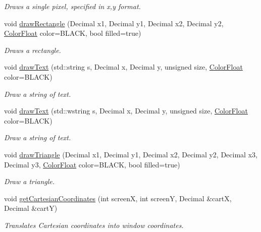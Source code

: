 \begin{DoxyCompactItemize}
\begin{DoxyCompactList}\small\item\em Draws a single pixel, specified in x,y format. \end{DoxyCompactList}\item 
void \hyperlink{classtsgl_1_1_cartesian_canvas_a5e88e7d751e24ae78d158f1d8e9faf5e}{draw\+Rectangle} (Decimal x1, Decimal y1, Decimal x2, Decimal y2, \hyperlink{structtsgl_1_1_color_float}{Color\+Float} color=B\+L\+A\+C\+K, bool filled=true)
\begin{DoxyCompactList}\small\item\em Draws a rectangle. \end{DoxyCompactList}\item 
void \hyperlink{classtsgl_1_1_cartesian_canvas_abb27abec67e31c0542e65bac08e977e6}{draw\+Text} (std\+::string s, Decimal x, Decimal y, unsigned size, \hyperlink{structtsgl_1_1_color_float}{Color\+Float} color=B\+L\+A\+C\+K)
\begin{DoxyCompactList}\small\item\em Draw a string of text. \end{DoxyCompactList}\item 
void \hyperlink{classtsgl_1_1_cartesian_canvas_a7a79637e902cb0a57315d9851a0974c3}{draw\+Text} (std\+::wstring s, Decimal x, Decimal y, unsigned size, \hyperlink{structtsgl_1_1_color_float}{Color\+Float} color=B\+L\+A\+C\+K)
\begin{DoxyCompactList}\small\item\em Draw a string of text. \end{DoxyCompactList}\item 
void \hyperlink{classtsgl_1_1_cartesian_canvas_a67c225592f9416de476943bb93309cd1}{draw\+Triangle} (Decimal x1, Decimal y1, Decimal x2, Decimal y2, Decimal x3, Decimal y3, \hyperlink{structtsgl_1_1_color_float}{Color\+Float} color=B\+L\+A\+C\+K, bool filled=true)
\begin{DoxyCompactList}\small\item\em Draw a triangle. \end{DoxyCompactList}\item 
void \hyperlink{classtsgl_1_1_cartesian_canvas_a736935074bb6d90bcc0c7af2edd8a4aa}{get\+Cartesian\+Coordinates} (int screen\+X, int screen\+Y, Decimal \&cart\+X, Decimal \&cart\+Y)
\begin{DoxyCompactList}\small\item\em Translates Cartesian coordinates into window coordinates. \end{DoxyCompactList}\item 

\end{DoxyCompactItemize}

